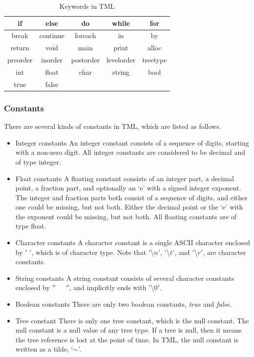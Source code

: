 \documentclass[12pt,psfig,a4]{article}
\begin{document}
\begin{table}[!ht]
\begin{center}
\begin{tabular}{| c | c | c | c | c |}
\hline
if & else & do & while & for \\
\hline
break & continue & foreach & in & by     \\  %
\hline
return & void & main & print & alloc \\
\hline
preorder & inorder & postorder & levelorder & treetype\\
\hline
int & float & char & string & bool \\
\hline
true & false & & &\\
\hline
\end{tabular}
\caption{Keywords in TML}
\label{keywords}
\end {center}
\end{table}

\subsubsection {Constants}
There are several kinds of constants in TML, which are listed as follows.

\begin{itemize}
\item Integer constants
An integer constant consists of a sequence of digits, starting with a non-zero digit. All integer constants are considered to be decimal and of type integer.

\item Float constants
A floating constant consists of an integer part, a decimal point, a fraction part, and optionally an `e' with a signed integer exponent. The integer and fraction parts both consist of a sequence of digits, and either one could be missing, but not both. Either the decimal point or the `e' with the exponent could be missing, but not both. All floating constants are of type float.

\item Character constants
A character constant is a single ASCII character enclosed by $'$ $'$, which is of character type. Note that $'$\textbackslash$n'$, $'$\textbackslash$t'$, and $'$\textbackslash$r'$, are character constants.

\item String constants
A string constant consists of several character constants enclosed by $''$~~~$''$, and implicitly ends with $'$\textbackslash$0'$.

\item Boolean constants
There are only two boolean constants, \textit{true} and \textit{false}.

\item Tree constant
There is only one tree constant, which is the null constant. The null constant is a null value of any tree type. If a tree is null, then it means the tree reference is lost at the point of time. In TML, the null constant is written as a tilde, `$\sim$'.

\end{itemize}
\end{document}
